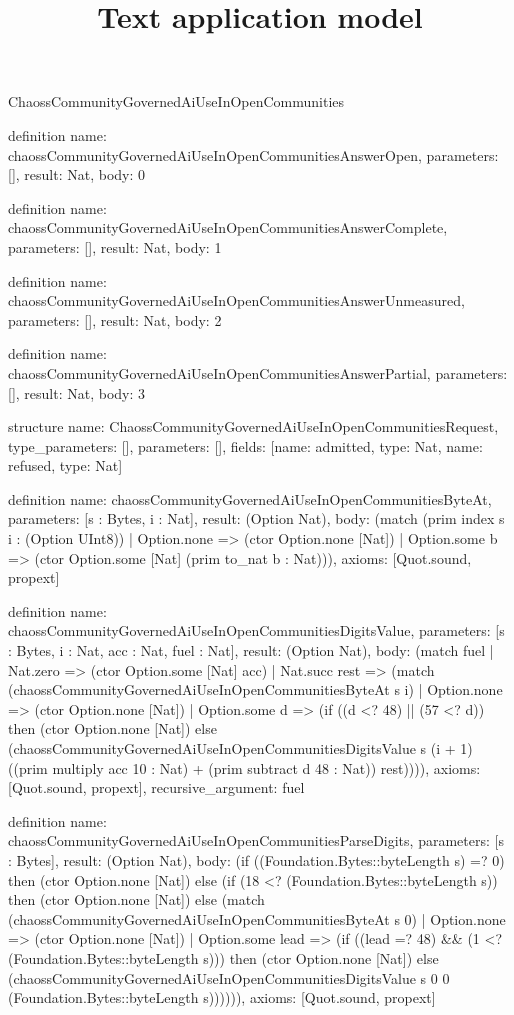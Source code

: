 \begin{lexlean}{ChaossCommunityGovernedAiUseInOpenCommunities}
\title{Text application model}
\begin{semanticmodule}
definition{
  name: chaossCommunityGovernedAiUseInOpenCommunitiesAnswerOpen,
  parameters: [],
  result: Nat,
  body: 0
}

definition{
  name: chaossCommunityGovernedAiUseInOpenCommunitiesAnswerComplete,
  parameters: [],
  result: Nat,
  body: 1
}

definition{
  name: chaossCommunityGovernedAiUseInOpenCommunitiesAnswerUnmeasured,
  parameters: [],
  result: Nat,
  body: 2
}

definition{
  name: chaossCommunityGovernedAiUseInOpenCommunitiesAnswerPartial,
  parameters: [],
  result: Nat,
  body: 3
}

structure{
  name: ChaossCommunityGovernedAiUseInOpenCommunitiesRequest,
  type_parameters: [],
  parameters: [],
  fields: [{name: admitted, type: Nat}, {name: refused, type: Nat}]
}

definition{
  name: chaossCommunityGovernedAiUseInOpenCommunitiesByteAt,
  parameters: [s : Bytes, i : Nat],
  result: (Option Nat),
  body: (match (prim index s i : (Option UInt8))
    | Option.none => (ctor Option.none [Nat])
    | Option.some b => (ctor Option.some [Nat] (prim to_nat b : Nat))),
  axioms: [Quot.sound, propext]
}

definition{
  name: chaossCommunityGovernedAiUseInOpenCommunitiesDigitsValue,
  parameters: [s : Bytes, i : Nat, acc : Nat, fuel : Nat],
  result: (Option Nat),
  body: (match fuel
    | Nat.zero => (ctor Option.some [Nat] acc)
    | Nat.succ rest => (match (chaossCommunityGovernedAiUseInOpenCommunitiesByteAt s i)
      | Option.none => (ctor Option.none [Nat])
      | Option.some d => (if ((d <? 48) || (57 <? d)) then (ctor Option.none [Nat]) else (chaossCommunityGovernedAiUseInOpenCommunitiesDigitsValue s (i + 1) ((prim multiply acc 10 : Nat) + (prim subtract d 48 : Nat)) rest)))),
  axioms: [Quot.sound, propext],
  recursive_argument: fuel
}

definition{
  name: chaossCommunityGovernedAiUseInOpenCommunitiesParseDigits,
  parameters: [s : Bytes],
  result: (Option Nat),
  body: (if ((Foundation.Bytes::byteLength s) =? 0) then (ctor Option.none [Nat]) else (if (18 <? (Foundation.Bytes::byteLength s)) then (ctor Option.none [Nat]) else (match (chaossCommunityGovernedAiUseInOpenCommunitiesByteAt s 0)
    | Option.none => (ctor Option.none [Nat])
    | Option.some lead => (if ((lead =? 48) && (1 <? (Foundation.Bytes::byteLength s))) then (ctor Option.none [Nat]) else (chaossCommunityGovernedAiUseInOpenCommunitiesDigitsValue s 0 0 (Foundation.Bytes::byteLength s)))))),
  axioms: [Quot.sound, propext]
}


\end{semanticmodule}
\end{lexlean}
